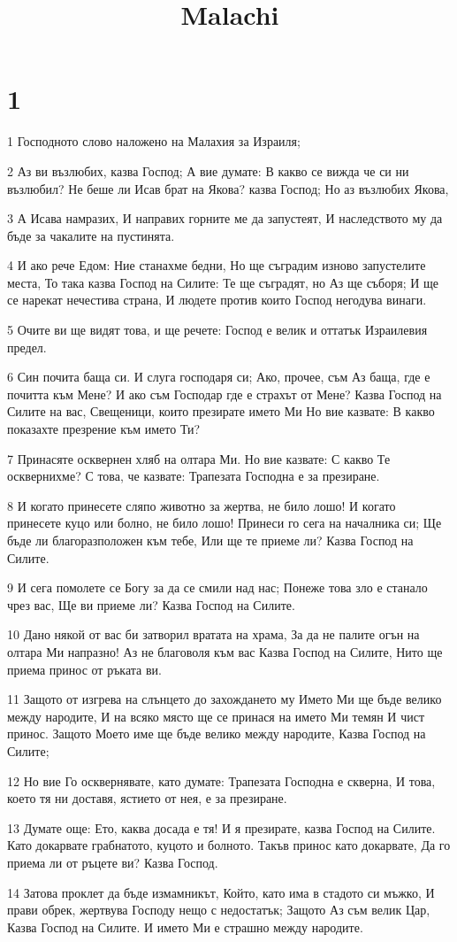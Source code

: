

\title{Malachi}


\chapter{1}

\par 1 Господното слово наложено на Малахия за Израиля;
\par 2 Аз ви възлюбих, казва Господ; А вие думате: В какво се вижда че си ни възлюбил? Не беше ли Исав брат на Якова? казва Господ; Но аз възлюбих Якова,
\par 3 А Исава намразих, И направих горните ме да запустеят, И наследството му да бъде за чакалите на пустинята.
\par 4 И ако рече Едом: Ние станахме бедни, Но ще съградим изново запустелите места, То така казва Господ на Силите: Те ще съградят, но Аз ще съборя; И ще се нарекат нечестива страна, И людете против които Господ негодува винаги.
\par 5 Очите ви ще видят това, и ще речете: Господ е велик и оттатък Израилевия предел.
\par 6 Син почита баща си. И слуга господаря си; Ако, прочее, съм Аз баща, где е почитта към Мене? И ако съм Господар где е страхът от Мене? Казва Господ на Силите на вас, Свещеници, които презирате името Ми Но вие казвате: В какво показахте презрение към името Ти?
\par 7 Принасяте осквернен хляб на олтара Ми. Но вие казвате: С какво Те осквернихме? С това, че казвате: Трапезата Господна е за презиране.
\par 8 И когато принесете сляпо животно за жертва, не било лошо! И когато принесете куцо или болно, не било лошо! Принеси го сега на началника си; Ще бъде ли благоразположен към тебе, Или ще те приеме ли? Казва Господ на Силите.
\par 9 И сега помолете се Богу за да се смили над нас; Понеже това зло е станало чрез вас, Ще ви приеме ли? Казва Господ на Силите.
\par 10 Дано някой от вас би затворил вратата на храма, За да не палите огън на олтара Ми напразно! Аз не благоволя към вас Казва Господ на Силите, Нито ще приема принос от ръката ви.
\par 11 Защото от изгрева на слънцето до захождането му Името Ми ще бъде велико между народите, И на всяко място ще се принася на името Ми темян И чист принос. Защото Моето име ще бъде велико между народите, Казва Господ на Силите;
\par 12 Но вие Го осквернявате, като думате: Трапезата Господна е скверна, И това, което тя ни доставя, ястието от нея, е за презиране.
\par 13 Думате още: Ето, каква досада е тя! И я презирате, казва Господ на Силите. Като докарвате грабнатото, куцото и болното. Такъв принос като докарвате, Да го приема ли от ръцете ви? Казва Господ.
\par 14 Затова проклет да бъде измамникът, Който, като има в стадото си мъжко, И прави обрек, жертвува Господу нещо с недостатък; Защото Аз съм велик Цар, Казва Господ на Силите. И името Ми е страшно между народите.

